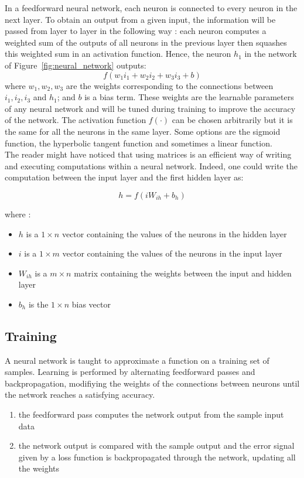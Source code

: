 In a feedforward neural network, each neuron is connected to every neuron in 
the next layer.  To obtain an output from a given input,
the information will be passed from layer to layer in the following way : 
each neuron computes a weighted sum of the outputs of all neurons in the
previous layer then squashes this weighted sum in an activation function. 
Hence, the neuron $h_1$ in the network of Figure~\ref{fig:neural_network}
outputs:
$$ f(w_1i_1 + w_2i_2 + w_3i_3 + b) $$
where $w_1, w_2, w_3$ are the weights corresponding to the connections between
$i_1, i_2, i_3$ and $h_1$; and $b$ is a bias term. 
These weights are the learnable parameters of any neural network and will be 
tuned during training to improve the accuracy of the network. 
The activation function $f(\cdot)$ can be chosen arbitrarily but it is
the same for all the neurons in the same layer. Some options are
the sigmoid function, the hyperbolic tangent function and sometimes a linear
function.\\

The reader might have noticed that using matrices is an efficient way of writing
and executing computations within a neural network. Indeed, one could write
the computation between the input layer and the first hidden layer as: 

$$ h = f(iW_{ih} + b_h) $$

\noindent where : 
\begin{itemize}
	\item $h$ is a $1\times n$ vector containing the values of the neurons 
		in the hidden layer
	\item $i$ is a $1\times m$ vector containing the values of the neurons
		in the input layer
	\item $W_{ih}$ is a $m\times n$ matrix containing the weights between
		the input and hidden layer
	\item $b_h$ is the $1\times n$ bias vector 
\end{itemize}

\subsection{Training}
A neural network is taught to approximate a function on a training
set of samples. Learning is performed by alternating feedforward passes and 
backpropagation, modifiying the weights of the connections between neurons until
the network reaches a satisfying accuracy.

\begin{enumerate}
	\item the feedforward pass computes the network output from the sample
		input data
	\item the network output is compared with the sample output and the
		error signal given by a loss function
		is backpropagated through the network, updating
		all the weights
\end{enumerate}

